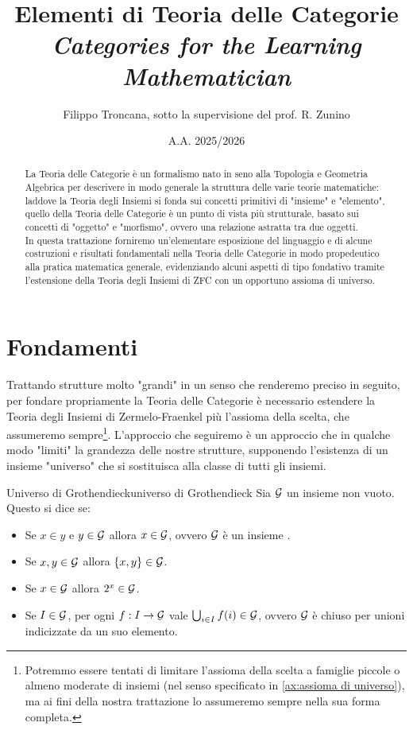 \documentclass{article}
\title{Elementi di Teoria delle Categorie\\ {\small\it Categories for the Learning Mathematician}}
\author{Filippo Troncana, sotto la supervisione del prof. R. Zunino}
\date{A.A. 2025/2026}
\begin{document}
\maketitle

\begin{abstract}
    La Teoria delle Categorie è un formalismo nato in seno alla Topologia e Geometria Algebrica per descrivere in modo generale la struttura delle varie teorie matematiche: laddove la Teoria degli Insiemi si fonda sui concetti primitivi di "insieme" e "elemento", quello della Teoria delle Categorie è un punto di vista più strutturale, basato sui concetti di "oggetto" e "morfismo", ovvero una relazione astratta tra due oggetti.\\
    In questa trattazione forniremo un'elementare esposizione del linguaggio e di alcune costruzioni e risultati fondamentali nella Teoria delle Categorie in modo propedeutico alla pratica matematica generale, evidenziando alcuni aspetti di tipo fondativo tramite l'estensione della Teoria degli Insiemi di ZFC con un opportuno assioma di universo.
\end{abstract}

\section*{Fondamenti}

Trattando strutture molto "grandi" in un senso che renderemo preciso in seguito, per fondare propriamente la Teoria delle Categorie è necessario estendere la Teoria degli Insiemi di Zermelo-Fraenkel più l'assioma della scelta, che assumeremo sempre\footnote{Potremmo essere tentati di limitare l'assioma della scelta a famiglie piccole o almeno moderate di insiemi (nel senso specificato in \ref{ax:assioma di universo}), ma ai fini della nostra trattazione lo assumeremo sempre nella sua forma completa.}. L'approccio che seguiremo è un approccio che in qualche modo "limiti" la grandezza delle nostre strutture, supponendo l'esistenza di un insieme "universo" che si sostituisca alla classe di tutti gli insiemi.

\begin{definition}{Universo di Grothendieck}{universo di Grothendieck}
    Sia $\mathcal{G}$ un insieme non vuoto. Questo si dice  se:\begin{itemize}
        \item Se $x\in y$ e $y \in \mathcal{G}$ allora $x \in \mathcal{G}$, ovvero $\mathcal{G}$ è un insieme .
        \item Se $x,y \in \mathcal{G}$ allora $\{x,y\}\in\mathcal{G}$.
        \item Se $x \in \mathcal{G}$ allora $2^x \in \mathcal{G}$.
        \item Se $I \in \mathcal{G}$, per ogni $f: I \to \mathcal{G}$ vale $\bigcup_{i \in I}f(i)\in \mathcal{G}$, ovvero $\mathcal{G}$ è chiuso per unioni indicizzate da un suo elemento.
    \end{itemize}
\end{definition}
\end{document}
